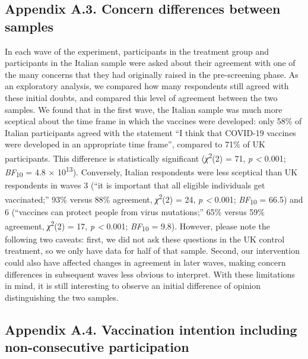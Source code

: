 \documentclass[authordate, empirical]{jote-new-article}
\begin{document}
	\subsection{Appendix A.3. Concern differences between samples}



	In each wave of the experiment, participants in the treatment group and participants in the Italian sample were asked about their agreement with one of the many concerns that they had originally raised in the pre-screening phase. As an exploratory analysis, we compared how many respondents still agreed with these initial doubts, and compared this level of agreement between the two samples. We found that in the first wave, the Italian sample was much more sceptical about the time frame in which the vaccines were developed: only 58\% of Italian participants agreed with the statement “I think that COVID-19 vaccines were developed in an appropriate time frame”, compared to 71\% of UK participants. This difference is statistically significant (\emph{χ}\textsuperscript{2}(2) = 71, \emph{p < }0.001; \emph{BF}\textsubscript{10 }= 4.8 × 10\textsuperscript{13}). Conversely, Italian respondents were less sceptical than UK respondents in waves 3 (“it is important that all eligible individuals get vaccinated;” 93\% versus 88\% agreement, \emph{χ}\textsuperscript{2}(2) = 24, \emph{p < }0.001; \emph{BF}\textsubscript{10 }= 66.5) and 6 (“vaccines can protect people from virus mutations;” 65\% versus 59\% agreement, \emph{χ}\textsuperscript{2}(2) = 17, \emph{p < }0.001; \emph{BF}\textsubscript{10 }= 9.8). However, please note the following two caveats: first, we did not ask these questions in the UK control treatment, so we only have data for half of that sample. Second, our intervention could also have affected changes in agreement in later waves, making concern differences in subsequent waves less obvious to interpret. With these limitations in mind, it is still interesting to observe an initial difference of opinion distinguishing the two samples.


\clearpage
	\subsection{Appendix A.4. Vaccination intention including non-consecutive participation}
\end{document}

